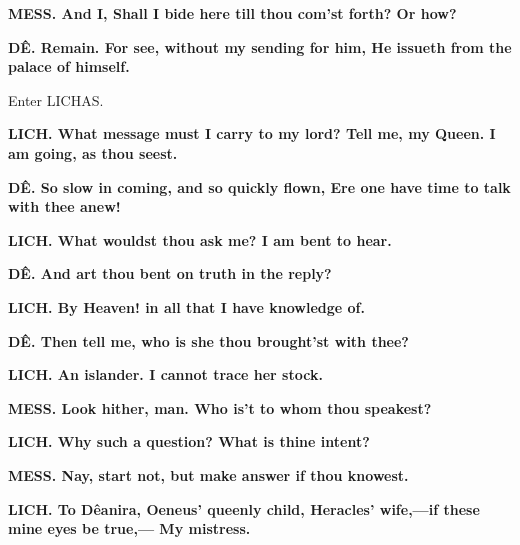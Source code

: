 \documentclass[11pt,letter]{book}
\begin{document}
\par \textbf{MESS. And I, Shall I bide here till thou com’st forth? Or how?}
\par 

\par \textbf{DÊ. Remain. For see, without my sending for him, He issueth from the palace of himself.}
\par 

\par  Enter LICHAS.

\par \textbf{LICH. What message must I carry to my lord? Tell me, my Queen. I am going, as thou seest.}
\par 

\par \textbf{DÊ. So slow in coming, and so quickly flown, Ere one have time to talk with thee anew!}
\par 

\par \textbf{LICH. What wouldst thou ask me? I am bent to hear.}
\par 

\par \textbf{DÊ. And art thou bent on truth in the reply?}
\par 

\par \textbf{LICH. By Heaven! in all that I have knowledge of.}
\par 

\par \textbf{DÊ. Then tell me, who is she thou brought’st with thee?}
\par 

\par \textbf{LICH. An islander. I cannot trace her stock.}
\par 

\par \textbf{MESS. Look hither, man. Who is’t to whom thou speakest?}
\par 

\par \textbf{LICH. Why such a question? What is thine intent?}
\par 

\par \textbf{MESS. Nay, start not, but make answer if thou knowest.}
\par 

\par \textbf{LICH. To Dêanira, Oeneus’ queenly child, Heracles’ wife,—if these mine eyes be true,— My mistress.}
\par 
\end{document}
